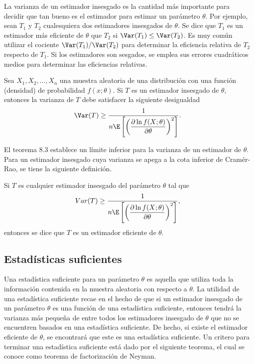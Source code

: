 La varianza de un estimador insesgado es la cantidad más importante para decidir que tan bueno es el estimador para estimar un parámetro $\theta$. Por ejemplo, sean $T_1$ y $T_2$ cualesquiera dos estimadores insesgados de $\theta$. Se dice que $T_1$ es un estimador más eficiente de $\theta$ que $T_2$ si $\Var(T_1)\leq \Var(T_2)$. Es muy común utilizar el cociente $\Var(T_1)/\Var(T_2)$ para determinar la eficiencia relativa de $T_2$ respecto de $T_1$. Si los estimadores son sesgados, se emplea sus errores cuadráticos medios para determinar las eficiencias relativas.\\


\begin{teo}
    Sea $X_1,X_2,\ldots,X_n$ una muestra aleatoria de una distribución con una función (densidad) de probabilidad $f(x;\theta)$. Si $T$ es un estimador insesgado de $\theta$, entonces la varianza de $T$ debe satisfacer la siguiente desigualdad
    $$\Var(T)\geq \dfrac{1}{n\E\left[\left(\dfrac{\partial \ln f(X;\theta)}{\partial \theta}\right)^2\right]}.$$
\end{teo}

El teorema 8.3 establece un límite inferior para la varianza de un estimador de $\theta$. Para un estimador insesgado cuya varianza se apega a la cota inferior de Cramér-Rao, se tiene la siguiente definición.

\begin{def.}
    Si $T$ es cualquier estimador insesgado del parámetro $\theta$ tal que
    $$Var(T)\geq \dfrac{1}{n\E\left[\left(\dfrac{\partial \ln f(X;\theta)}{\partial \theta}\right)^2\right]},$$
    entonces se dice que $T$ es un estimador eficiente de $\theta$.
\end{def.}
\vspace{.5cm}

\subsection{Estadísticas suficientes}
Una estadística suficiente para un parámetro $\theta$ es aquella que utiliza toda la información contenida en la muestra aleatoria con respecto a $\theta$. La utilidad de una estadística suficiente recae en el hecho de que si un estimador insesgado de un parámetro $\theta$ es una función de una estadística suficiente, entonces tendrá la varianza más pequeña de entre todos los estimadores insesgado de $\theta$ que no se encuentren basados en una estadística suficiente. De hecho, si existe el estimador eficiente de $\theta$, se encontrará que este es una estadística suficiente. Un critero para terminar una estadística suficiente está dado por el siguiente teorema, el cual se conoce como teorema de factorización de Neyman.

